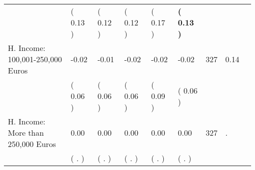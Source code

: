 \begin{tabular}{L{6.2cm} C{1.8cm} C{1.8cm} C{1.8cm} C{1.8cm} C{1.8cm} C{1.8cm} C{0.3cm} C{0.3cm}}
 & (     0.13 ) & (     0.12 ) & (     0.12 ) & (     0.17 ) & \textbf{(     0.13 )}  & \\
H. Income: 100,001-250,000 Euros &     -0.02 &     -0.01 &     -0.02 &     -0.02 &     -0.02  & 327 &       0.14 \\ 
 & (     0.06 ) & (     0.06 ) & (     0.06 ) & (     0.09 ) & (     0.06 )  & \\
H. Income: More than 250,000 Euros &      0.00 &      0.00 &      0.00 &      0.00 &      0.00  & 327 &          . \\ 
 & (        . ) & (        . ) & (        . ) & (        . ) & (        . )  & \\
\bottomrule
\end{tabular}
